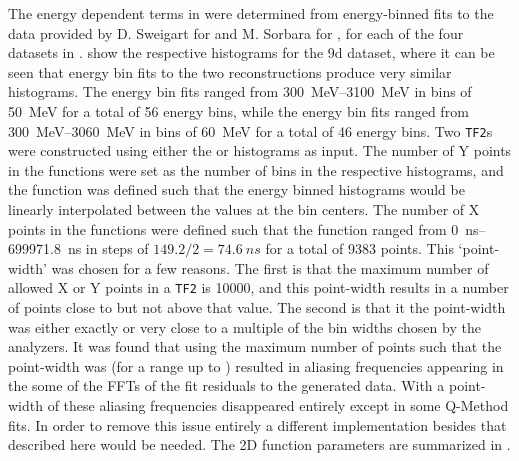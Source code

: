 The energy dependent terms in  were determined from energy-binned fits to the data provided by D. Sweigart for \RE and M. Sorbara for \RW, for each of the four datasets in \Rone.  show the respective histograms for the 9d dataset, where it can be seen that energy bin fits to the two reconstructions produce very similar histograms. The \RE energy bin fits ranged from \SIrange{300}{3100}{\MeV} in bins of \SI{50}{\MeV} for a total of 56 energy bins, while the \RW energy bin fits ranged from \SIrange{300}{3060}{\MeV} in bins of \SI{60}{\MeV} for a total of 46 energy bins. Two \texttt{TF2}s were constructed using either the \RE or \RW histograms as input. The number of Y points in the functions were set as the number of bins in the respective histograms, and the function was defined such that the energy binned histograms would be linearly interpolated between the values at the bin centers. The number of X points in the functions were defined such that the function ranged from \SIrange{0}{699971.8}{ns} in steps of $149.2/2 = \SI{74.6}{ns}$ for a total of 9383 points. This `point-width' was chosen for a few reasons. The first is that the maximum number of allowed X or Y points in a \texttt{TF2} is 10000, and this point-width results in a number of points close to but not above that value. The second is that it the point-width was either exactly or very close to a multiple of the bin widths chosen by the analyzers. It was found that using the maximum number of points such that the point-width was  (for a range up to ) resulted in aliasing frequencies appearing in the some of the FFTs of the fit residuals to the generated data. With a point-width of  these aliasing frequencies disappeared entirely except in some Q-Method fits. In order to remove this issue entirely a different implementation besides that described here would be needed. The 2D function parameters are summarized in .



